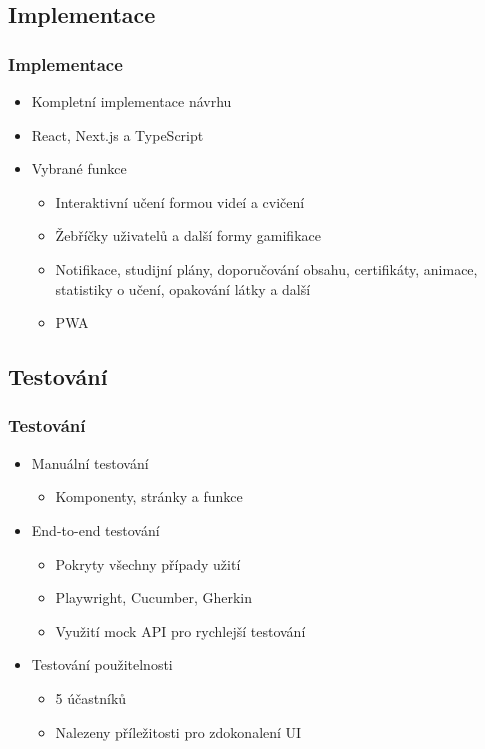 \documentclass[a4paper]{beamer}
\begin{document}

\subsection*{Implementace}
\begin{frame}
\frametitle{Implementace}
\begin{itemize}
    \item Kompletní implementace návrhu
    \item React, Next.js a TypeScript %
    \item Vybrané funkce
    \begin{itemize}
        \item Interaktivní učení formou videí a cvičení
        \item Žebříčky uživatelů a další formy gamifikace
        \item Notifikace, studijní plány, doporučování obsahu, certifikáty, animace, statistiky o učení, opakování látky a další
        \item PWA
    \end{itemize}
\end{itemize}
\end{frame}

\subsection*{Testování}
\begin{frame}
\frametitle{Testování}
\begin{itemize}
    \item Manuální testování
    \begin{itemize}
        \item Komponenty, stránky a funkce
    \end{itemize}
    \item End-to-end testování
    \begin{itemize}
        \item Pokryty všechny případy užití
        \item Playwright, Cucumber, Gherkin
        \item Využití mock API pro rychlejší testování
    \end{itemize}
    \item Testování použitelnosti
    \begin{itemize}
        \item 5 účastníků
        \item Nalezeny příležitosti pro zdokonalení UI
    \end{itemize}
\end{itemize}
\end{frame}
\end{document}
